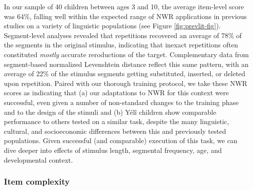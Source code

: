 \documentclass[english,,man,floatsintext]{apa6}
\begin{document}
In our sample of 40 children between ages 3 and 10, the average item-level score was 64\%, falling well within the expected range of NWR applications in previous studies on a variety of linguistic populations (see Figure \ref{fig:prevlit-fig}). Segment-level analyses revealed that repetitions recovered an average of 78\% of the segments in the original stimulus, indicating that inexact repetitions often constituted \emph{mostly} accurate reroductions of the target. Complementary data from segment-based normalized Levenshtein distance reflect this same pattern, with an average of 22\% of the stimulus segments getting substituted, inserted, or deleted upon repetition. Paired with our thorough training protocol, we take these NWR scores as indicating that (a) our adaptations to NWR for this context were successful, even given a number of non-standard changes to the training phase and to the design of the stimuli and (b) Yélî children show comparable performance to others tested on a similar task, despite the many linguistic, cultural, and socioeconomic differences between this and previously tested populations. Given successful (and comparable) execution of this task, we can dive deeper into effects of stimulus length, segmental frequency, age, and developmental context.

\hypertarget{item-complexity}{%
\subsubsection{Item complexity}\label{item-complexity}}
\end{document}
